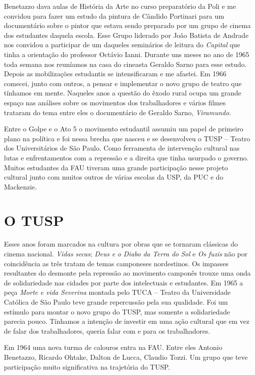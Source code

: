 Benetazzo dava aulas de História da Arte no curso preparatório da Poli e
me convidou para fazer um estudo da pintura de Cândido Portinari para um
documentário sobre o pintor que estava sendo preparado por um grupo de
cinema dos estudantes daquela escola. Esse Grupo liderado por João
Batista de Andrade nos convidou a participar de um daqueles seminários
de leitura do \textit{Capital} que tinha a orientação do professor Octávio
Ianni. Durante uns meses no ano de 1965 toda semana nos reuníamos na
casa do cineasta Geraldo Sarno para esse estudo. Depois as mobilizações
estudantis se intensificaram e me afastei. Em 1966 comecei, junto com
outros, a pensar e implementar o novo grupo de teatro que tínhamos em
mente. Naqueles anos a questão do êxodo rural ocupa um grande espaço nas
análises sobre os movimentos dos trabalhadores e vários filmes trataram
do tema entre eles o documentário de Geraldo Sarno, \textit{Viramundo}.

Entre o Golpe e o Ato 5 o movimento estudantil assumiu um papel de
primeiro plano na política e foi nessa brecha que nasceu e se
desenvolveu o TUSP -- Teatro dos Universitários de São Paulo. Como
ferramenta de intervenção cultural nas lutas e enfrentamentos com a
repressão e a direita que tinha usurpado o governo. Muitos estudantes da
FAU tiveram uma grande participação nesse projeto cultural junto com
muitos outros de várias escolas da USP, da PUC e do Mackenzie.

\section{O TUSP}

Esses anos foram marcados na cultura por obras que se tornaram clássicas
do cinema nacional. \textit{Vidas secas}; \textit{Deus e o Diabo da Terra do
Sol} e \textit{Os fuzis} não por coincidência as três tratam de temas
camponeses nordestinos. Os impasses resultantes do desmonte pela
repressão ao movimento camponês trouxe uma onda de solidariedade nas
cidades por parte dos intelectuais e estudantes. Em 1965 a peça
\textit{Morte e vida Severina} montada pelo TUCA -- Teatro da Universidade
Católica de São Paulo teve grande repercussão pela sua qualidade. Foi um
estímulo para montar o novo grupo do TUSP, mas somente a solidariedade
parecia pouco. Tínhamos a intenção de investir em uma ação cultural que
em vez de falar dos trabalhadores, queria falar com e para os
trabalhadores.

Em 1964 uma nova turma de calouros entra na FAU. Entre eles Antonio
Benetazzo, Ricardo Ohtake, Dalton de Lucca, Claudio Tozzi. Um grupo que
teve participação muito significativa na trajetória do TUSP.


